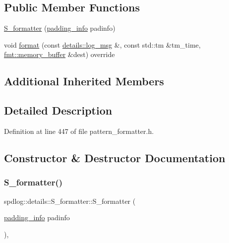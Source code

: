 \subsection*{Public Member Functions}
\begin{DoxyCompactItemize}
\item 
\hyperlink{classspdlog_1_1details_1_1_s__formatter_a8e9ddad945ae1f9bfc79adb0286723a6}{S\+\_\+formatter} (\hyperlink{structspdlog_1_1details_1_1padding__info}{padding\+\_\+info} padinfo)
\item 
void \hyperlink{classspdlog_1_1details_1_1_s__formatter_aec1945b20074132e9ebe7d94357081fa}{format} (const \hyperlink{structspdlog_1_1details_1_1log__msg}{details\+::log\+\_\+msg} \&, const std\+::tm \&tm\+\_\+time, \hyperlink{format_8h_a21cbf729f69302f578e6db21c5e9e0d2}{fmt\+::memory\+\_\+buffer} \&dest) override
\end{DoxyCompactItemize}
\subsection*{Additional Inherited Members}


\subsection{Detailed Description}


Definition at line 447 of file pattern\+\_\+formatter.\+h.



\subsection{Constructor \& Destructor Documentation}
\mbox{\label{classspdlog_1_1details_1_1_s__formatter_a8e9ddad945ae1f9bfc79adb0286723a6}} 
\subsubsection{\texorpdfstring{S\+\_\+formatter()}{S\_formatter()}}
{\footnotesize\ttfamily spdlog\+::details\+::\+S\+\_\+formatter\+::\+S\+\_\+formatter (\begin{DoxyParamCaption}\item[{\hyperlink{structspdlog_1_1details_1_1padding__info}{padding\+\_\+info}}]{padinfo }\end{DoxyParamCaption})\hspace{0.3cm}{\ttfamily [inline]}, {\ttfamily [explicit]}}



